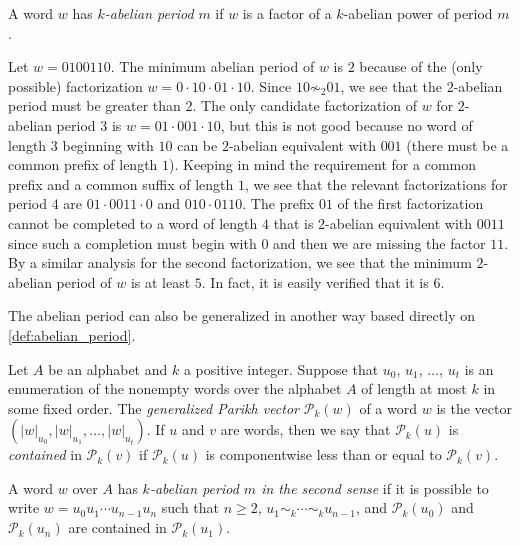 \documentclass[a4paper,fleqn]{article}
\providecommand{\abs}[1]{\lvert#1\rvert}
\newcommand{\Parikh}[2][]{\mathcal{P}_{#1}(#2)}
\begin{document}
  \begin{definition}
    A word $w$ has \emph{$k$-abelian period} $m$ if $w$ is a factor of a $k$-abelian power of period $m$.
  \end{definition}

  \begin{example}\label{ex:k-ab_example}
    Let $w = 0100110$. The minimum abelian period of $w$ is $2$ because of the (only possible) factorization
    $w = 0 \cdot 10 \cdot 01 \cdot 10$. Since $10 \not\sim_2 01$, we see that the $2$-abelian period must be greater
    than $2$. The only candidate factorization of $w$ for $2$-abelian period $3$ is $w = 01 \cdot 001 \cdot 10$, but
    this is not good because no word of length $3$ beginning with $10$ can be $2$-abelian equivalent with $001$ (there
    must be a common prefix of length $1$). Keeping in mind the requirement for a common prefix and a common suffix of
    length $1$, we see that the relevant factorizations for period $4$ are $01 \cdot 0011 \cdot 0$ and
    $010 \cdot 0110$. The prefix $01$ of the first factorization cannot be completed to a word of length $4$ that is
    $2$-abelian equivalent with $0011$ since such a completion must begin with $0$ and then we are missing the factor
    $11$. By a similar analysis for the second factorization, we see that the minimum $2$-abelian period of $w$ is at
    least $5$. In fact, it is easily verified that it is $6$.
  \end{example}

  The abelian period can also be generalized in another way based directly on \autoref{def:abelian_period}.

  \begin{definition}
    Let $A$ be an alphabet and $k$ a positive integer. Suppose that $u_0$, $u_1$, $\ldots$, $u_t$ is an enumeration of
    the nonempty words over the alphabet $A$ of length at most $k$ in some fixed order. The \emph{generalized Parikh
    vector} $\Parikh[k]{w}$ of a word $w$ is the vector $(\abs{w}_{u_0}, \abs{w}_{u_1}, \ldots, \abs{w}_{u_t})$. If
    $u$ and $v$ are words, then we say that $\Parikh[k]{u}$ is \emph{contained} in $\Parikh[k]{v}$ if $\Parikh[k]{u}$
    is componentwise less than or equal to $\Parikh[k]{v}$.
  \end{definition}

  \begin{definition}
    A word $w$ over $A$ has \emph{$k$-abelian period $m$ in the second sense} if it is possible to write
    $w = u_0 u_1 \dotsm u_{n-1} u_n$ such that $n \geq 2$, $u_1 \sim_k \dotsm \sim_k u_{n-1}$, and $\Parikh[k]{u_0}$
    and $\Parikh[k]{u_n}$ are contained in $\Parikh[k]{u_1}$.
  \end{definition}
\end{document}
